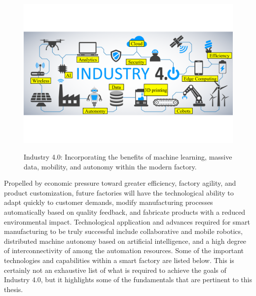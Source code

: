 \begin{figure}[!tbp]
	\begin{center}
		\includegraphics[width=\textwidth]{chapter-intro/images/intro/forbes-i40-candell.png}
		\label{fig:intro:forbes-i40}
		\caption{Industry 4.0: Incorporating the benefits of machine learning, massive data, mobility, and autonomy within the modern factory.}
	\end{center}
\end{figure}

Propelled by economic pressure toward greater efficiency, factory agility, and product customization, future factories will have the technological ability to adapt quickly to customer demands, modify manufacturing processes automatically based on quality feedback, and fabricate products with a reduced environmental impact.  Technological application and advances required for smart manufacturing to be truly successful include collaborative and mobile robotics, distributed machine autonomy based on artificial intelligence, and a high degree of interconnectivity of among the automation resources.  Some of the important technologies and capabilities within a smart factory are listed below.  This is certainly not an exhaustive list of what is required to achieve the goals of Industry 4.0, but it highlights some of the fundamentals that are pertinent to this thesis.

